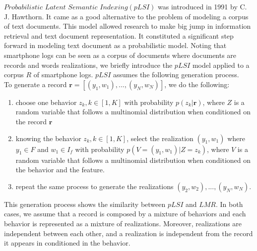 $Probabilistic$ $Latent$ $Semantic$ $Indexing(pLSI)$ was introduced in 1991 by C. J. Hawthorn\cite{plsi}. It came as a good alternative to the problem of modeling a corpus of text documents. This model allowed research to make big jump in information retrieval and text document representation. It constituted a significant step forward in modeling text document as a probabilistic model. Noting that smartphone logs can be seen as a corpus of documents where documents are records and words realizations, we briefly introduce the $pLSI$ model applied to a corpus $R$ of smartphone logs. $pLSI$ assumes the following generation process.
\\To generate a record $\mathbf{r}=[(y_{1},w_{1}),...,(y_{N},w_{N})]$, we do the following:
\begin{enumerate} 
	\item choose one behavior $z_{k},k\in [1,K]$ with probability $p(z_{k}|\mathbf{r})$, where $Z$ is a random variable that follows a multinomial distribution when conditioned on the record $\mathbf{r}$
	\item knowing the behavior $z_{k},k\in [1,K]$, select the realization $(y_{1},w_{1})$ where $y_{1}\in F$ and $w_{1}\in I_{f}$ with probability $p(V=(y_{1},w_{1})|Z=z_{k})$, where $V$ is a random variable that follows a 				multinomial distribution when conditioned on the behavior and the feature.
	\item repeat the same process to generate the realizations $(y_{2},w_{2}),...,(y_{N},w_{N})$. 
\end{enumerate} 
This generation process shows the similarity between $pLSI$ and $LMR$. In both cases, we assume that a record is composed by a mixture of behaviors and each behavior is represented as a mixture of realizations. Moreover, realizations are independent between each other, and a realization is independent from the record it appears in conditioned in the behavior.\par

